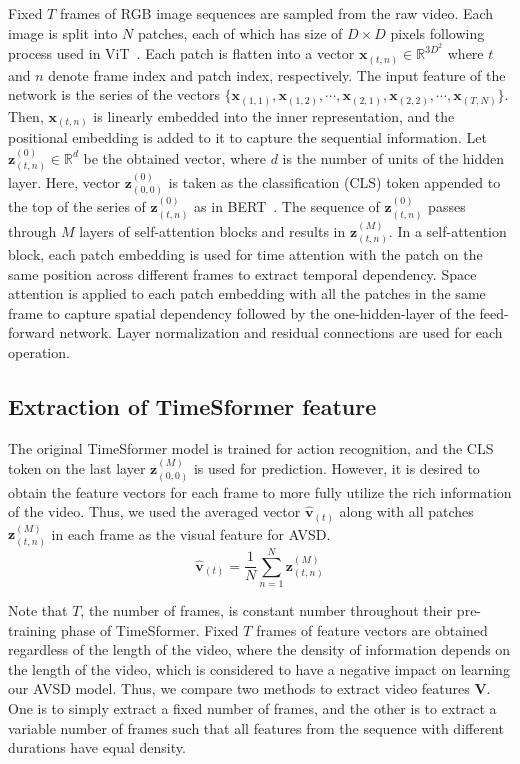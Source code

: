 \documentclass[letterpaper]{article}
\begin{document}
Fixed $T$ frames of RGB image sequences are sampled from the raw video.
Each image is split into $N$ patches, each of which has size of $D \times D$ pixels following process used in ViT~\cite{Dosovitskiy2020image}.
Each patch is flatten into a vector $\bm{x}_{(t,n)} \in \mathbb{R}^{3D^{2}}$ where $t$ and $n$ denote frame index and patch index, respectively.
The input feature of the network is the series of the vectors $\{\bm{x}_{(1,1)}, \bm{x}_{(1,2)}, \cdots, \bm{x}_{(2,1)}, \bm{x}_{(2,2)}, \cdots, \bm{x}_{(T,N)}\}$.
Then, $\bm{x}_{(t,n)}$ is linearly embedded into the inner representation, and the positional embedding is added to it to capture the sequential information.
Let $\bm{z}^{(0)}_{(t,n)} \in \mathbb{R}^{d}$ be the obtained vector, where $d$ is the number of units of the hidden layer.
Here, vector $\bm{z}^{(0)}_{(0,0)}$ is taken as the classification (CLS) token appended to the top of the series of $\bm{z}^{(0)}_{(t,n)}$ as in BERT~\cite{Devlin2018bert}.
The sequence of $\bm{z}^{(0)}_{(t,n)}$ passes through $M$ layers of self-attention blocks and results in $\bm{z}^{(M)}_{(t,n)}$.
In a self-attention block, each patch embedding is used for time attention with the patch on the same position across different frames to extract temporal dependency.
Space attention is applied to each patch embedding with all the patches in the same frame to capture spatial dependency followed by the one-hidden-layer of the feed-forward network.
Layer normalization and residual connections are used for each operation.

\subsection{Extraction of TimeSformer feature}
The original TimeSformer model is trained for action recognition, and the CLS token on the last layer $\bm{z}^{(M)}_{(0,0)}$ is used for prediction.
However, it is desired to obtain the feature vectors for each frame to more fully utilize the rich information of the video.
Thus, we used the averaged vector $\bm{\hat{v}}_{(t)}$ along with all patches $\bm{z}^{(M)}_{(t,n)}$ in each frame as the visual feature for AVSD.
\begin{equation}
  \bm{\hat{v}}_{(t)} = \frac{1}{N}\sum_{n=1}^{N}\bm{z}^{(M)}_{(t,n)}
\end{equation}

Note that $T$, the number of frames, is constant number throughout their pre-training phase of TimeSformer.
Fixed $T$ frames of feature vectors are obtained regardless of the length of the video, where the density of information depends on the length of the video, which is considered to have a negative impact on learning our AVSD model.
Thus, we compare two methods to extract video features $\bm{V}$.
One is to simply extract a fixed number of frames, and the other is to extract a variable number of frames such that all features from the sequence with different durations have equal density.
\end{document}
